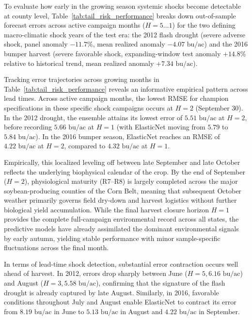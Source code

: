 To evaluate how early in the growing season systemic shocks become detectable at county level, Table~\ref{tab:tail_risk_performance} breaks down out-of-sample forecast errors across active campaign months ($H = 5 \dots 1$) for the two defining macro-climatic shock years of the test era: the 2012 flash drought (severe adverse shock, panel anomaly $-11.7\%$, mean realized anomaly $-4.07\text{ bu/ac}$) and the 2016 bumper harvest (severe favorable shock, expanding-window test anomaly $+14.8\%$ relative to historical trend, mean realized anomaly $+7.34\text{ bu/ac}$).



Tracking error trajectories across growing months in Table~\ref{tab:tail_risk_performance} reveals an informative empirical pattern across lead times. Across active campaign months, the lowest RMSE for champion specifications in these specific shock campaigns occurs at $H=2$ (September 30). In the 2012 drought, the ensemble attains its lowest error of $5.51\text{ bu/ac}$ at $H=2$, before recording $5.66\text{ bu/ac}$ at $H=1$ (with ElasticNet moving from $5.79$ to $5.84\text{ bu/ac}$). In the 2016 bumper season, ElasticNet reaches an RMSE of $4.22\text{ bu/ac}$ at $H=2$, compared to $4.32\text{ bu/ac}$ at $H=1$.

Empirically, this localized leveling off between late September and late October reflects the underlying biophysical calendar of the crop. By the end of September ($H=2$), physiological maturity (R7--R8) is largely completed across the major soybean-producing counties of the Corn Belt, meaning that subsequent October weather primarily governs field dry-down and harvest logistics without further biological yield accumulation. While the final harvest closure horizon $H=1$ provides the complete full-campaign environmental record across all states, the predictive models have already assimilated the dominant environmental signals by early autumn, yielding stable performance with minor sample-specific fluctuations across the final month.

In terms of lead-time shock detection, substantial error contraction occurs well ahead of harvest. In 2012, errors drop sharply between June ($H=5, 6.16\text{ bu/ac}$) and August ($H=3, 5.58\text{ bu/ac}$), confirming that the signature of the flash drought is already captured by late August. Similarly, in 2016, favorable conditions throughout July and August enable ElasticNet to contract its error from $8.19\text{ bu/ac}$ in June to $5.13\text{ bu/ac}$ in August and $4.22\text{ bu/ac}$ in September.

